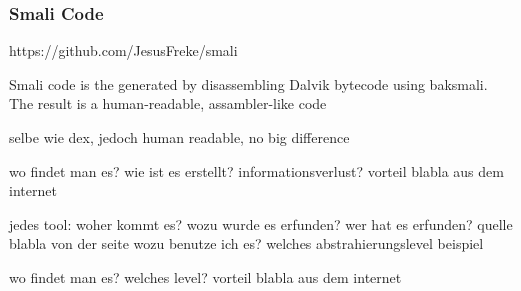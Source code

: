 \subsubsection{Smali Code}\label{subsubsection:tools-baksmali}
https://github.com/JesusFreke/smali

Smali code is the generated by disassembling Dalvik bytecode using baksmali. The result is a human-readable, assambler-like code


selbe wie dex, jedoch human readable, no big difference

wo findet man es?\newline
wie ist es erstellt?\newline
informationsverlust?\newline
vorteil\newline
blabla aus dem internet\newline

jedes tool:\newline
woher kommt es?\newline
wozu wurde es erfunden?\newline
wer hat es erfunden? quelle\newline
blabla von der seite\newline
wozu benutze ich es?\newline
welches abstrahierungslevel\newline
beispiel\newline


wo findet man es?\newline
welches level?\newline
vorteil\newline
blabla aus dem internet\newline
